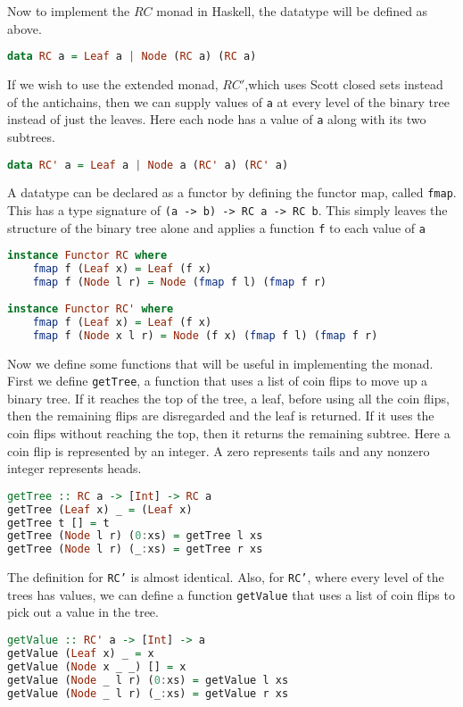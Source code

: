 Now to implement the $RC$ monad in Haskell, the datatype will be defined as above.
\begin{lstlisting}[language=Haskell]
data RC a = Leaf a | Node (RC a) (RC a)
\end{lstlisting}
If we wish to use the extended monad, $RC'$,which uses Scott closed sets instead of the antichains, then we can supply values of \texttt{a} at every level of the binary tree instead of just the leaves.  Here each node has a value of \texttt{a} along with its two subtrees.
\begin{lstlisting}[language=Haskell]
data RC' a = Leaf a | Node a (RC' a) (RC' a)
\end{lstlisting}
A datatype can be declared as a functor by defining the functor map, called \texttt{fmap}.  This has a type signature of \texttt{(a -> b) -> RC a -> RC b}.  This simply leaves the structure of the binary tree alone and applies a function \texttt{f} to each value of \texttt{a}
\begin{lstlisting}[language=Haskell]
instance Functor RC where 
    fmap f (Leaf x) = Leaf (f x)
    fmap f (Node l r) = Node (fmap f l) (fmap f r)
    
instance Functor RC' where 
    fmap f (Leaf x) = Leaf (f x)
    fmap f (Node x l r) = Node (f x) (fmap f l) (fmap f r)
\end{lstlisting}
Now we define some functions that will be useful in implementing the monad.  First we define \texttt{getTree}, a function that uses a list of coin flips to move up a binary tree.  If it reaches the top of the tree, a leaf, before using all the coin flips, then the remaining flips are disregarded and the leaf is returned.  If it uses the coin flips without reaching the top, then it returns the remaining subtree.  Here a coin flip is represented by an integer.  A zero represents tails and any nonzero integer represents heads.
\begin{lstlisting}[language=Haskell]
getTree :: RC a -> [Int] -> RC a
getTree (Leaf x) _ = (Leaf x)
getTree t [] = t
getTree (Node l r) (0:xs) = getTree l xs
getTree (Node l r) (_:xs) = getTree r xs
\end{lstlisting}
The definition for \texttt{RC'} is almost identical.  Also, for \texttt{RC'}, where every level of the trees has values, we can define a function \texttt{getValue} that uses a list of coin flips to pick out a value in the tree.
\begin{lstlisting}[language=Haskell]
getValue :: RC' a -> [Int] -> a
getValue (Leaf x) _ = x
getValue (Node x _ _) [] = x
getValue (Node _ l r) (0:xs) = getValue l xs
getValue (Node _ l r) (_:xs) = getValue r xs
\end{lstlisting}

